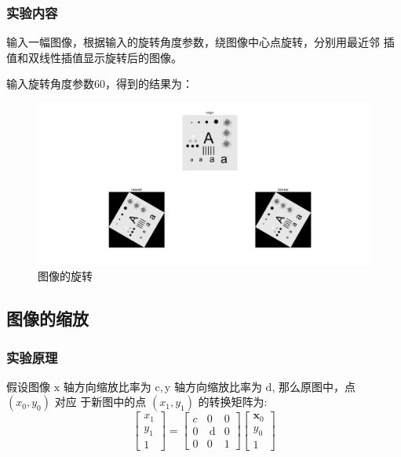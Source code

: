 \documentclass{ctexart}
\begin{document}
\subsubsection{\hei 实验内容}
输入一幅图像，根据输入的旋转角度参数，绕图像中心点旋转，分别用最近邻
插值和双线性插值显示旋转后的图像。
\par 输入旋转角度参数$60$，得到的结果为：
\begin{figure}[H]
    \centering
    \includegraphics[scale=0.3]{1_2.png}
    \caption{图像的旋转}
\end{figure}
\subsection{\hei 图像的缩放}
\subsubsection{\hei 实验原理}
假设图像 $\mathrm{x}$ 轴方向缩放比率为 $\mathrm{c}, \mathrm{y}$ 轴方向缩放比率为 $\mathrm{d}$, 那么原图中，点 $\left(x_{0}, y_{0}\right)$ 对应 于新图中的点 $\left(x_{1}, y_{1}\right)$ 的转换矩阵为:
$$
    \left[\begin{array}{l}
            x_{1} \\
            y_{1} \\
            1
        \end{array}\right]=\left[\begin{array}{lll}
            c & 0           & 0 \\
            0 & \mathrm{~d} & 0 \\
            0 & 0           & 1
        \end{array}\right]\left[\begin{array}{l}
            \boldsymbol{x}_{0} \\
            y_{0}              \\
            1
        \end{array}\right]
$$
\end{document}
